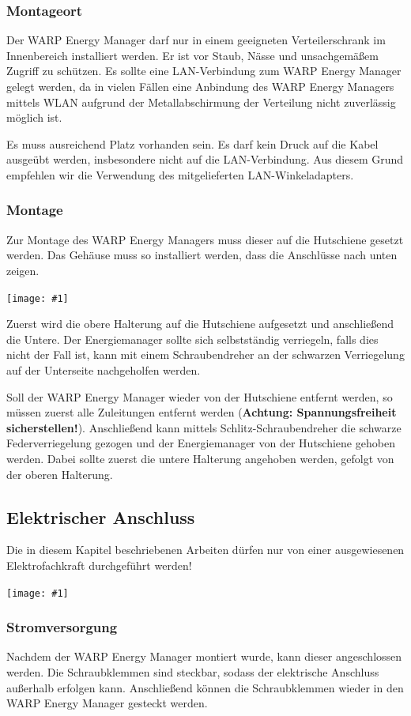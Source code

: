 \documentclass[a4paper,10pt]{article}
\newcommand{\hint}[1]{\begin{tcolorbox}[colback=boxgray,colframe=black,coltext=
white,title=Hinweis,left*=2mm,right*=2mm,boxsep=1mm,bottom=1mm,top=1mm]#1\end{tcolorbox}}
\newcommand{\gfx}[1]{\texttt{[image: \#1]}}
\begin{document}
\begin{multicols*}{2}
	\subsubsection{Montageort}
	Der WARP Energy Manager darf nur in einem geeigneten Verteilerschrank im
	Innenbereich installiert werden. Er ist vor Staub, Nässe und unsachgemäßem
	Zugriff zu schützen. Es sollte
	eine LAN-Verbindung zum WARP Energy Manager gelegt werden, da in vielen
	Fällen eine Anbindung des WARP Energy Managers mittels WLAN aufgrund
	der Metallabschirmung der Verteilung nicht zuverlässig möglich ist.

	Es muss ausreichend Platz vorhanden sein. Es darf kein Druck auf die Kabel
	ausgeübt werden, insbesondere nicht auf die LAN-Verbindung. Aus diesem Grund
	empfehlen wir die Verwendung des mitgelieferten LAN-Winkeladapters.

	\subsubsection{Montage}
	Zur Montage des WARP Energy Managers muss dieser auf die Hutschiene
	gesetzt werden. Das Gehäuse muss so installiert werden, dass die Anschlüsse
	nach unten zeigen.

	\gfx{./img/wem_mounting.jpg}

	Zuerst wird die obere Halterung auf die Hutschiene aufgesetzt und anschließend
	die Untere. Der Energiemanager sollte sich selbstständig verriegeln, falls dies
	nicht der Fall ist, kann mit einem Schraubendreher an der schwarzen Verriegelung
	auf der Unterseite nachgeholfen werden.

	Soll der WARP Energy Manager wieder von der Hutschiene entfernt werden, so
	müssen zuerst alle Zuleitungen entfernt werden (\textbf{Achtung: Spannungsfreiheit
	sicherstellen!}). Anschließend kann mittels Schlitz-Schraubendreher die schwarze
	Federverriegelung gezogen und der Energiemanager von der Hutschiene
	gehoben werden. Dabei sollte zuerst die untere Halterung angehoben werden,
	gefolgt von der oberen Halterung.

	\subsection{Elektrischer Anschluss}
	\hint{Die in diesem Kapitel beschriebenen Arbeiten dürfen nur von einer ausgewiesenen
		Elektrofachkraft durchgeführt werden!}

	\gfx{./img/wem_connections.jpg}


	\subsubsection{Stromversorgung}
	Nachdem der WARP Energy Manager montiert wurde, kann dieser angeschlossen werden.
	Die Schraubklemmen sind steckbar, sodass der elektrische Anschluss
	außerhalb erfolgen kann. Anschließend können die Schraubklemmen wieder in
	den WARP Energy Manager gesteckt werden.


\end{multicols*}
\end{document}
